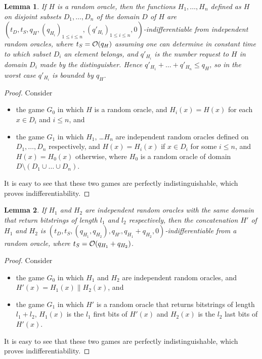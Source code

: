 \documentclass[compsoc, conference, letterpaper, 10pt, times]{IEEEtran}
\newtheorem{lemma}{Lemma}
\newcommand{\ab}{\allowbreak}
\begin{document}
\begin{lemma}\label{lem:disjdomain}
If $H$ is a random oracle, then the functions $H_1, \dots, H_n$ defined 
as $H$ on disjoint subsets $D_1, \dots, D_n$ of the domain $D$ of $H$ are $(t_D, \ab t_S, \ab q_H, \ab (q_{H_i})_{1 \leq i \leq n}, \ab (q'_{H_i})_{1 \leq i \leq n}, 0)$-indifferentiable
from independent random oracles, where $t_S = {\cal O}(q_H)$ assuming one can determine in constant time to which subset $D_i$ an element belongs, and $q'_{H_i}$ is the number request to $H$ in domain $D_i$ made by the distinguisher. Hence $q'_{H_1} + \dots + q'_{H_n} \leq q_H$, so in the worst case $q'_{H_i}$ is bounded by $q_H$. 
\end{lemma}
\begin{proof}
Consider
\begin{itemize}[leftmargin=*]
\item  the game $G_0$ in which $H$ is a random oracle, and $H_i(x) = H(x)$
for each $x \in D_i$ and $i \leq n$, and 
\item the game $G_1$ in which $H_1$, \dots $H_n$ 
are independent random oracles defined on $D_1, \dots, D_n$ respectively, and
$H(x) = H_i(x)$ if $x \in D_i$ for some $i \leq n$, and $H(x) = H_0(x)$ otherwise,
where $H_0$ is a random oracle of domain $D \setminus (D_1 \cup \dots \cup D_n)$.
\end{itemize}
It is easy to see that these two games are perfectly indistinguishable,
which proves indifferentiability.
\end{proof}

\begin{lemma}\label{lem:concatenation}
If $H_1$ and $H_2$ are independent random oracles with the same domain that return bitstrings of length $l_1$ and $l_2$ respectively, then 
the concatenation $H'$ of $H_1$ and $H_2$ is $(t_D, t_S, (q_{H_1}, q_{H_2}), q_{H'}, q_{H_1} + q_{H_2}, 0)$-indifferentiable from a random oracle, where $t_S = {\cal O}(q_{H_1} + q_{H_2})$.
\end{lemma}
\begin{proof}
Consider
\begin{itemize}[leftmargin=*]
\item  the game $G_0$ in which $H_1$ and $H_2$ are independent random oracles,
  and $H'(x) = H_1(x) \| H_2(x)$, and
\item the game $G_1$ in which $H'$ is a random oracle that returns bitstrings
  of length $l_1 + l_2$, $H_1(x)$ is the $l_1$ first bits of $H'(x)$
  and $H_2(x)$ is the $l_2$ last bits of $H'(x)$.
\end{itemize}
It is easy to see that these two games are perfectly indistinguishable,
which proves indifferentiability.
\end{proof}
\end{document}
